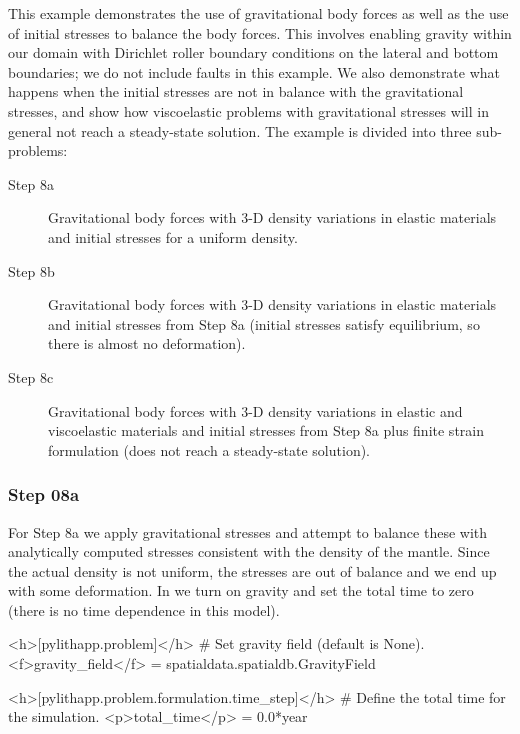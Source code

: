 This example demonstrates the use of gravitational body forces as well
as the use of initial stresses to balance the body forces. This
involves enabling gravity within our domain with Dirichlet roller
boundary conditions on the lateral and bottom boundaries; we do not
include faults in this example.  We also demonstrate what happens when
the initial stresses are not in balance with the gravitational
stresses, and show how viscoelastic problems with gravitational
stresses will in general not reach a steady-state solution. The
example is divided into three sub-problems:
\begin{description}
\item[Step 8a] Gravitational body forces with 3-D density variations
  in elastic materials and initial stresses for a uniform density.
\item[Step 8b] Gravitational body forces with 3-D density variations
  in elastic materials and initial stresses from Step 8a (initial
  stresses satisfy equilibrium, so there is almost no deformation).
\item[Step 8c] Gravitational body forces with 3-D density variations
  in elastic and viscoelastic materials and initial stresses from
  Step 8a plus finite strain formulation (does not reach a steady-state
  solution).
\end{description}

\subsubsection{Step 08a}

For Step 8a we apply gravitational stresses and attempt to balance
these with analytically computed stresses consistent with the density
of the mantle. Since the actual density is not uniform, the stresses
are out of balance and we end up with some deformation. In
 we turn on gravity and set the total time to
zero (there is no time dependence in this model).
\begin{cfg}
<h>[pylithapp.problem]</h>
# Set gravity field (default is None).
<f>gravity_field</f> = spatialdata.spatialdb.GravityField

<h>[pylithapp.problem.formulation.time_step]</h>
# Define the total time for the simulation.
<p>total_time</p> = 0.0*year
\end{cfg}

